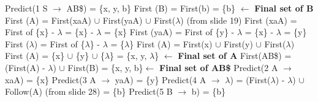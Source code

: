 \documentclass{report}
\begin{document}
\begin{multicols}{2}
\setlength{\leftskip}{-12em}
\hspace{-.5cm}Predict(1 S $\rightarrow$ AB\$) = \{x, y, b\}\newline
\indent\hspace{.25cm}First (B) = First(b) = \{b\} $\leftarrow$ \textbf{Final set of B}\newline
\indent\hspace{.25cm}First (A) = First(xaA) $\cup$  First(yaA) $\cup$  First($\lambda$) (from slide 19)\newline
\indent\hspace{1cm}First (xaA) = First of \{x\} - $\lambda$ = \{x\} - $\lambda$ = \{x\}\newline
\indent\hspace{1cm}First (yaA) = First of \{y\} - $\lambda$ = \{x\} - $\lambda$ = \{y\}\newline
\indent\hspace{1cm}First ($\lambda$) = First of \{$\lambda$\} - $\lambda$ = \{$\lambda$\}\newline
\indent\hspace{1cm}First (A) = First(x) $\cup$  First(y) $\cup$  First($\lambda$)\newline
\indent\hspace{1cm}First (A) = \{x\} $\cup$ \{y\} $\cup$  \{$\lambda$\} = \{x, y, $\lambda$\} $\leftarrow$ \textbf{Final set of A}\newline
\indent\hspace{.25cm}First(AB\$) = (First(A) - $\lambda$) $\cup$ First(B) = \{x, y, b\}$\leftarrow$ \textbf{Final set of AB\$} \newline
Predict(2 A $\rightarrow$ xaA) = \{x\}\newline
Predict(3 A $\rightarrow$ yaA) = \{y\}\newline
Predict(4 A $\rightarrow$ $\lambda$) = (First($\lambda$) - $\lambda$) $\cup$ Follow(A)				(from slide 28)\newline
\indent\hspace{2.3cm}= \{b\}\newline
Predict(5 B $\rightarrow$ b) = \{b\}
\end{multicols}
\end{document}
